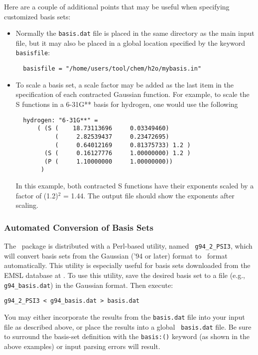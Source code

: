 Here are a couple of additional points that may be useful when
specifying customized basis sets:
\begin{itemize}
\item Normally the {\tt basis.dat} file is placed in the same
directory as the main input file, but it may also be placed in a
global location specified by the keyword {\tt basisfile}:
\begin{verbatim}
  basisfile = "/home/users/tool/chem/h2o/mybasis.in"
\end{verbatim}
\item To scale a basis set, a scale factor may be added as the last item
in the specification of each contracted Gaussian function.  For
example, to scale the S functions in a 6-31G** basis for hydrogen,
one would use the following
\begin{verbatim}
  hydrogen: "6-31G**" =
      ( (S (    18.73113696     0.03349460)
           (     2.82539437     0.23472695)
           (     0.64012169     0.81375733) 1.2 )
        (S (     0.16127776     1.00000000) 1.2 )
        (P (     1.10000000     1.00000000))
       )
\end{verbatim}
In this example, both contracted S functions have their exponents
scaled by a factor of (1.2)$^2$ = 1.44.  The output file should show
the exponents after scaling.
\end{itemize}

\subsubsection{Automated Conversion of Basis Sets}

The \PSIthree\ package is distributed with a Perl-based utility, named {\tt
g94\_2\_PSI3}, which will convert basis sets from the Gaussian ('94 or later)
format to \PSIthree\ format automatically.  This utility is especially useful
for basis sets downloaded from the EMSL database at .
To use this utility, save the desired basis set to a file (e.g., {\tt
g94\_basis.dat}) in the Gaussian format.  Then execute:
\begin{verbatim}
g94_2_PSI3 < g94_basis.dat > basis.dat
\end{verbatim}
You may either incorporate the results from the {\tt basis.dat} file into
your input file as described above, or place the results into a global {\tt
basis.dat} file.  Be sure to surround the basis-set definition with the
{\tt basis:()} keyword (as shown in the above examples) or input parsing
errors will result.
